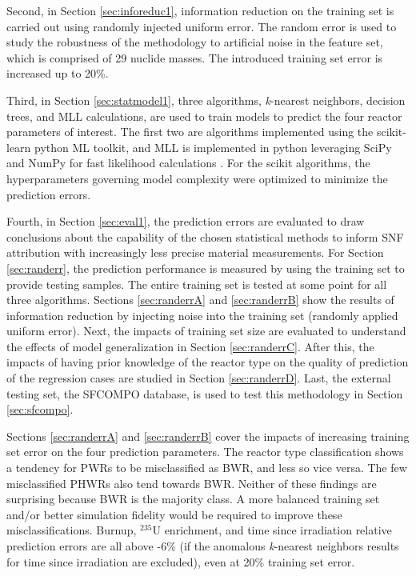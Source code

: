 Second, in Section \ref{sec:inforeduc1}, information reduction on the training
set is carried out using randomly injected uniform error. The random error is
used to study the robustness of the methodology to artificial noise in the
feature set, which is comprised of 29 nuclide masses.  The introduced training
set error is increased up to 20\%.

Third, in Section \ref{sec:statmodel1}, three algorithms, \textit{k}-nearest
neighbors, decision trees, and \gls{MLL} calculations, are used to train models
to predict the four reactor parameters of interest.  The first two are
algorithms implemented using the scikit-learn python \gls{ML} toolkit, and
\gls{MLL} is implemented in python leveraging SciPy and NumPy for fast
likelihood calculations \cite{scikit, scipy, numpy}.  For the scikit
algorithms, the hyperparameters governing model complexity were optimized to
minimize the prediction errors.  

Fourth, in Section \ref{sec:eval1}, the prediction errors are evaluated to draw
conclusions about the capability of the chosen statistical methods to inform
\gls{SNF} attribution with increasingly less precise material measurements.
For Section \ref{sec:randerr}, the prediction performance is measured by using
the training set to provide testing samples. The entire training set is tested
at some point for all three algorithms.  Sections \ref{sec:randerrA} and
\ref{sec:randerrB} show the results of information reduction by injecting noise
into the training set (randomly applied uniform error).  Next, the impacts of
training set size are evaluated to understand the effects of model
generalization in Section \ref{sec:randerrC}. After this, the impacts of having
prior knowledge of the reactor type on the quality of prediction of the
regression cases are studied in Section \ref{sec:randerrD}.  Last, the external
testing set, the \gls{SFCOMPO} database, is used to test this methodology in
Section \ref{sec:sfcompo}. 

Sections \ref{sec:randerrA} and \ref{sec:randerrB} cover the impacts of
increasing training set error on the four prediction parameters.  The reactor
type classification shows a tendency for \glspl{PWR} to be misclassified as
\gls{BWR}, and less so vice versa. The few misclassified \glspl{PHWR} also
tend towards \gls{BWR}. Neither of these findings are surprising because
\gls{BWR} is the majority class. A more balanced training set and/or better
simulation fidelity would be required to improve these misclassifications.
Burnup, ${}^{235}\text{U}$ enrichment, and time since irradiation relative
prediction errors are all above -6\% (if the anomalous \textit{k}-nearest
neighbors results for time since irradiation are excluded), even at 20\%
training set error.

